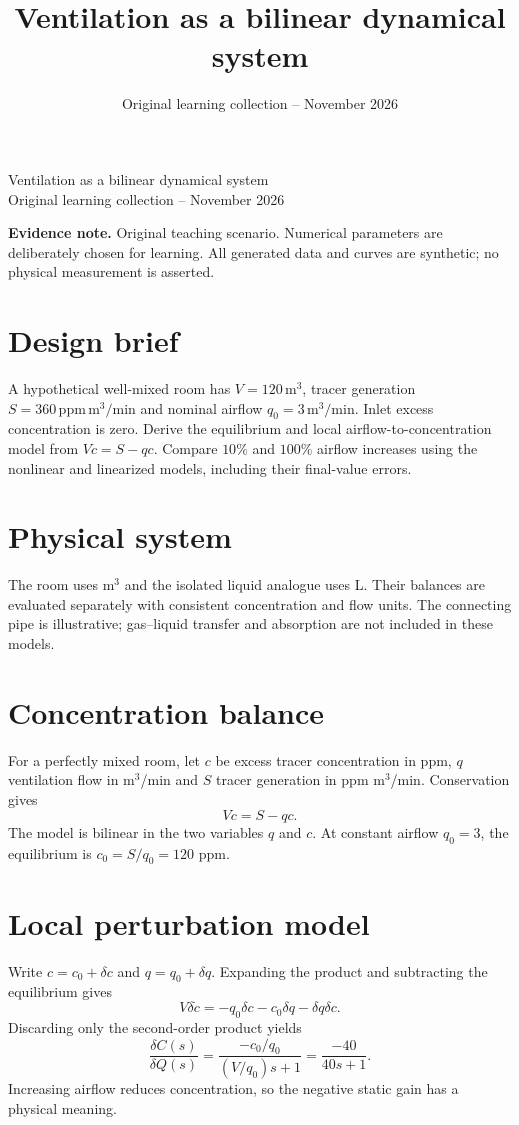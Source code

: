 \documentclass[10pt,a4paper]{article}
\title{\color{ink}Ventilation as a bilinear dynamical system}
\author{}
\date{Original learning collection -- November 2026}
\begin{document}
\begin{center}{\LARGE\color{ink}Ventilation as a bilinear dynamical system}\\[5pt]{\small Original learning collection -- November 2026}\end{center}

\textbf{Evidence note.} Original teaching scenario. Numerical parameters are deliberately chosen for learning. All generated data and curves are synthetic; no physical measurement is asserted.
\section{Design brief}
A hypothetical well-mixed room has $V=120\,\mathrm{m^3}$, tracer generation $S=360\,\mathrm{ppm\,m^3/min}$ and nominal airflow $q_0=3\,\mathrm{m^3/min}$. Inlet excess concentration is zero. Derive the equilibrium and local airflow-to-concentration model from $V\dot c=S-qc$. Compare $10\%$ and $100\%$ airflow increases using the nonlinear and linearized models, including their final-value errors.
\section{Physical system}
\begin{center}\resizebox{.88\linewidth}{!}{}\par{\small The room uses m$^3$ and the isolated liquid analogue uses L. Their balances are evaluated separately with consistent concentration and flow units. The connecting pipe is illustrative; gas--liquid transfer and absorption are not included in these models.}\end{center}
\section{Concentration balance}
For a perfectly mixed room, let $c$ be excess tracer concentration in ppm, $q$ ventilation flow in m$^3$/min and $S$ tracer generation in ppm m$^3$/min. Conservation gives
\[V\dot c=S-qc.\]
The model is bilinear in the two variables $q$ and $c$. At constant airflow $q_0=3$, the equilibrium is $c_0=S/q_0=120$ ppm.
\section{Local perturbation model}
Write $c=c_0+\delta c$ and $q=q_0+\delta q$. Expanding the product and subtracting the equilibrium gives
\[V\delta\dot c=-q_0\delta c-c_0\delta q-\delta q\delta c.\]
Discarding only the second-order product yields
\[\frac{\delta C(s)}{\delta Q(s)}=\frac{-c_0/q_0}{(V/q_0)s+1}=\frac{-40}{40s+1}.\]
Increasing airflow reduces concentration, so the negative static gain has a physical meaning.
\end{document}

